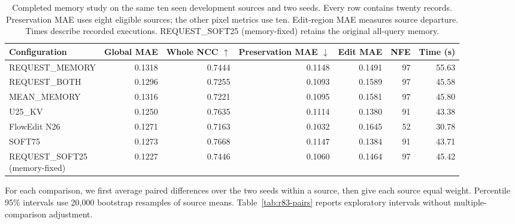 \begin{table}[t]
\centering\footnotesize
\setlength{\tabcolsep}{4pt}
\caption{Completed memory study on the same ten seen development sources and two seeds. Every row contains twenty records. Preservation MAE uses eight eligible sources; the other pixel metrics use ten. Edit-region MAE measures source departure. Times describe recorded executions. REQUEST\_SOFT25 (memory-fixed) retains the original all-query memory.}
\label{tab:r83-means}
\begin{tabular}{lrrrrrr}
\toprule
Configuration & Global MAE & Whole NCC $\uparrow$ & Preservation MAE $\downarrow$ & Edit MAE & NFE & Time (s)\\
\midrule
REQUEST\_MEMORY & 0.1318 & 0.7444 & 0.1148 & 0.1491 & 97 & 55.63\\
REQUEST\_BOTH & 0.1296 & 0.7255 & 0.1093 & 0.1589 & 97 & 45.58\\
MEAN\_MEMORY & 0.1316 & 0.7221 & 0.1095 & 0.1581 & 97 & 45.80\\
U25\_KV & 0.1250 & 0.7635 & 0.1114 & 0.1380 & 91 & 43.38\\
FlowEdit N26 & 0.1271 & 0.7163 & 0.1032 & 0.1645 & 52 & 30.78\\
SOFT75 & 0.1273 & 0.7668 & 0.1147 & 0.1384 & 91 & 43.71\\
\shortstack[l]{REQUEST\_SOFT25\\(memory-fixed)} & 0.1227 & 0.7446 & 0.1060 & 0.1464 & 97 & 45.42\\
\bottomrule
\end{tabular}
\end{table}

For each comparison, we first average paired differences over the two seeds within a source, then give each source equal weight. Percentile 95\% intervals use 20,000 bootstrap resamples of source means. Table~\ref{tab:r83-pairs} reports exploratory intervals without multiple-comparison adjustment.

